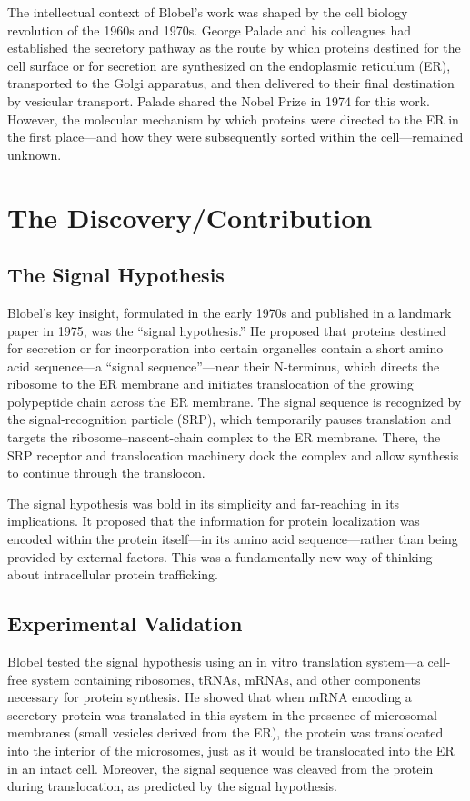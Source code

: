 The intellectual context of Blobel's work was shaped by the cell biology revolution of the 1960s and 1970s. George Palade and his colleagues had established the secretory pathway as the route by which proteins destined for the cell surface or for secretion are synthesized on the endoplasmic reticulum (ER), transported to the Golgi apparatus, and then delivered to their final destination by vesicular transport. Palade shared the Nobel Prize in 1974 for this work. However, the molecular mechanism by which proteins were directed to the ER in the first place---and how they were subsequently sorted within the cell---remained unknown.

\section{The Discovery/Contribution}

\subsection{The Signal Hypothesis}

Blobel's key insight, formulated in the early 1970s and published in a landmark paper in 1975, was the ``signal hypothesis.'' He proposed that proteins destined for secretion or for incorporation into certain organelles contain a short amino acid sequence---a ``signal sequence''---near their N-terminus, which directs the ribosome to the ER membrane and initiates translocation of the growing polypeptide chain across the ER membrane. The signal sequence is recognized by the signal-recognition particle (SRP), which temporarily pauses translation and targets the ribosome--nascent-chain complex to the ER membrane. There, the SRP receptor and translocation machinery dock the complex and allow synthesis to continue through the translocon.

The signal hypothesis was bold in its simplicity and far-reaching in its implications. It proposed that the information for protein localization was encoded within the protein itself---in its amino acid sequence---rather than being provided by external factors. This was a fundamentally new way of thinking about intracellular protein trafficking.

\subsection{Experimental Validation}

Blobel tested the signal hypothesis using an in vitro translation system---a cell-free system containing ribosomes, tRNAs, mRNAs, and other components necessary for protein synthesis. He showed that when mRNA encoding a secretory protein was translated in this system in the presence of microsomal membranes (small vesicles derived from the ER), the protein was translocated into the interior of the microsomes, just as it would be translocated into the ER in an intact cell. Moreover, the signal sequence was cleaved from the protein during translocation, as predicted by the signal hypothesis.


